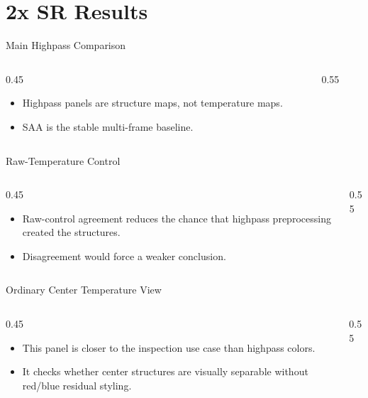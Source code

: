 \section{2x SR Results}

\begin{frame}{Main Highpass Comparison}
  \begin{columns}[c]
    \begin{column}{0.45\textwidth}
      \begin{itemize}
        \item Highpass panels are structure maps, not temperature maps.
        \item SAA is the stable multi-frame baseline.
      \end{itemize}
    \end{column}
    \begin{column}{0.55\textwidth}
      \centering
    \end{column}
  \end{columns}
\end{frame}

\begin{frame}{Raw-Temperature Control}
  \begin{columns}[c]
    \begin{column}{0.45\textwidth}
      \begin{itemize}
        \item Raw-control agreement reduces the chance that highpass preprocessing created the structures.
        \item Disagreement would force a weaker conclusion.
      \end{itemize}
    \end{column}
    \begin{column}{0.55\textwidth}
      \centering
    \end{column}
  \end{columns}
\end{frame}

\begin{frame}{Ordinary Center Temperature View}
  \begin{columns}[c]
    \begin{column}{0.45\textwidth}
      \begin{itemize}
        \item This panel is closer to the inspection use case than highpass colors.
        \item It checks whether center structures are visually separable without red/blue residual styling.
      \end{itemize}
    \end{column}
    \begin{column}{0.55\textwidth}
      \centering
    \end{column}
  \end{columns}
\end{frame}
